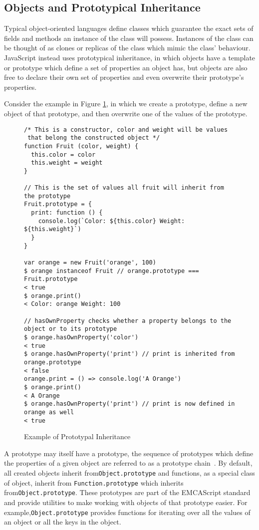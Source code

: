 \documentclass[]{final_report}
\begin{document}
\subsection{Objects and Prototypical Inheritance}
Typical object-oriented languages define classes which guarantee the exact sets of fields and methods an instance of the class will possess. Instances of the class can be thought of as clones or replicas of the class which mimic the class' behaviour. JavaScript instead uses prototypical inheritance, in which objects have a template or prototype which define a set of properties an object has, but objects are also free to declare their own set of properties and even overwrite their prototype's properties. 

Consider the example in Figure \ref{fig:js-prototypical-inheritance}, in which we create a prototype, define a new object of that prototype, and then overwrite one of the values of the prototype.

\begin{figure}[h]
\begin{verbatim}
/* This is a constructor, color and weight will be values
 that belong the constructed object */
function Fruit (color, weight) {
  this.color = color
  this.weight = weight
}

// This is the set of values all fruit will inherit from the prototype
Fruit.prototype = {
  print: function () {
    console.log(`Color: ${this.color} Weight: ${this.weight}`)
  }
}

var orange = new Fruit('orange', 100)
$ orange instanceof Fruit // orange.prototype === Fruit.prototype
< true
$ orange.print()
< Color: orange Weight: 100

// hasOwnProperty checks whether a property belongs to the object or to its prototype
$ orange.hasOwnProperty('color') 
< true
$ orange.hasOwnProperty('print') // print is inherited from orange.prototype
< false
orange.print = () => console.log('A Orange')
$ orange.print()
< A Orange
$ orange.hasOwnProperty('print') // print is now defined in orange as well
< true
\end{verbatim}
\caption{\label{fig:js-prototypical-inheritance} Example of Prototypal Inheritance}
\end{figure} 

A prototype may itself have a prototype, the sequence of prototypes which define the properties of a given object are referred to as a prototype chain~\cite{EcmaScript, borning1986classes}. By default, all created objects inherit from\lstinline{Object.prototype} and functions, as a special class of object, inherit from \lstinline{Function.prototype} which inherits from\lstinline{Object.prototype}. These prototypes are part of the EMCAScript standard and provide utilities to make working with objects of that prototype easier. For example,\lstinline{Object.prototype} provides functions for iterating over all the values of an object or all the keys in the object.
\end{document}
